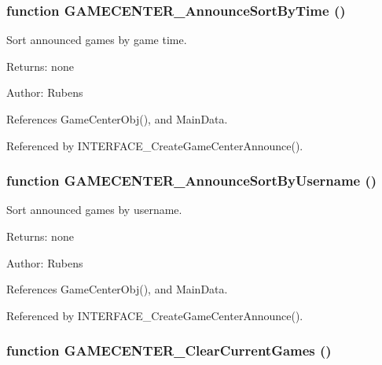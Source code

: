\subsubsection[GAMECENTER\_\-AnnounceSortByTime]{\setlength{\rightskip}{0pt plus 5cm}function GAMECENTER\_\-AnnounceSortByTime ()}\label{gamecenter_2gamecenter_8js_8bfda1ee533f81b09fea92ace1a112ca}


Sort announced games by game time. 

\begin{Desc}
\item[Returns:]none \end{Desc}
\begin{Desc}
\item[Author:]Rubens \end{Desc}


References GameCenterObj(), and MainData.

Referenced by INTERFACE\_\-CreateGameCenterAnnounce().
\subsubsection[GAMECENTER\_\-AnnounceSortByUsername]{\setlength{\rightskip}{0pt plus 5cm}function GAMECENTER\_\-AnnounceSortByUsername ()}\label{gamecenter_2gamecenter_8js_220acdb680fbe0ac040090c145a6750e}


Sort announced games by username. 

\begin{Desc}
\item[Returns:]none \end{Desc}
\begin{Desc}
\item[Author:]Rubens \end{Desc}


References GameCenterObj(), and MainData.

Referenced by INTERFACE\_\-CreateGameCenterAnnounce().
\subsubsection[GAMECENTER\_\-ClearCurrentGames]{\setlength{\rightskip}{0pt plus 5cm}function GAMECENTER\_\-ClearCurrentGames ()}\label{gamecenter_2gamecenter_8js_327e7364b34c7ed4fdb03027e1dec30d}


